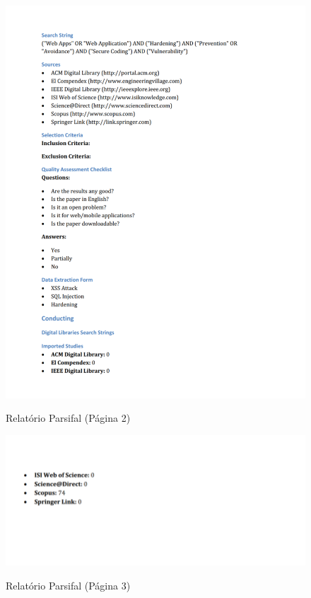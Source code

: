 \begin{figure}[H]
    \centering
    \caption{Relatório Parsifal (Página 2)}
    \includegraphics[width=16cm]{figuras/parsifal_report_2.png} 
    \label{fig:internet} 
\end{figure}
\begin{figure}[H]
    \centering
    \caption{Relatório Parsifal (Página 3)}
    \includegraphics[width=16cm]{figuras/parsifal_report_3.png} 
    \label{fig:internet} 
\end{figure}
